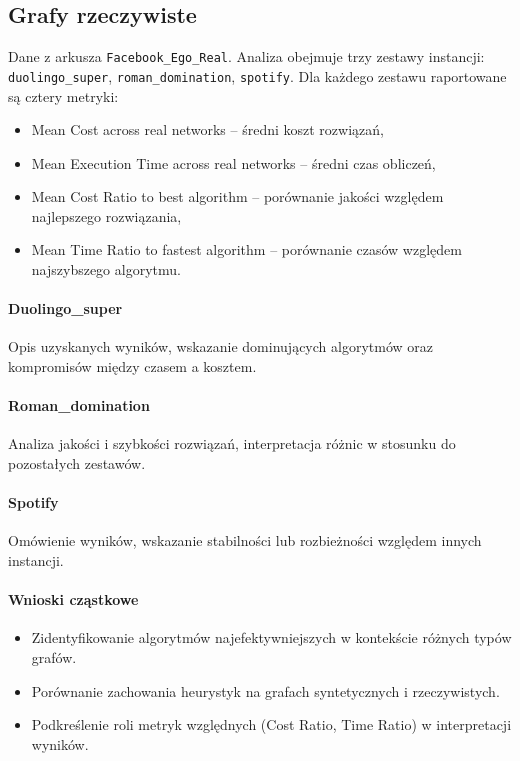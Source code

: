 \subsection{Grafy rzeczywiste}

Dane z arkusza \texttt{Facebook\_Ego\_Real}. Analiza obejmuje trzy zestawy instancji: \texttt{duolingo\_super}, \texttt{roman\_domination}, \texttt{spotify}. 
Dla każdego zestawu raportowane są cztery metryki:

\begin{itemize}
    \item Mean Cost across real networks – średni koszt rozwiązań,
    \item Mean Execution Time across real networks – średni czas obliczeń,
    \item Mean Cost Ratio to best algorithm – porównanie jakości względem najlepszego rozwiązania,
    \item Mean Time Ratio to fastest algorithm – porównanie czasów względem najszybszego algorytmu.
\end{itemize}

\paragraph{Duolingo\_super}
Opis uzyskanych wyników, wskazanie dominujących algorytmów oraz kompromisów między czasem a kosztem.

\paragraph{Roman\_domination}
Analiza jakości i szybkości rozwiązań, interpretacja różnic w stosunku do pozostałych zestawów.

\paragraph{Spotify}
Omówienie wyników, wskazanie stabilności lub rozbieżności względem innych instancji.

\paragraph{Wnioski cząstkowe}
\begin{itemize}
    \item Zidentyfikowanie algorytmów najefektywniejszych w kontekście różnych typów grafów.
    \item Porównanie zachowania heurystyk na grafach syntetycznych i rzeczywistych.
    \item Podkreślenie roli metryk względnych (Cost Ratio, Time Ratio) w interpretacji wyników.
\end{itemize}


